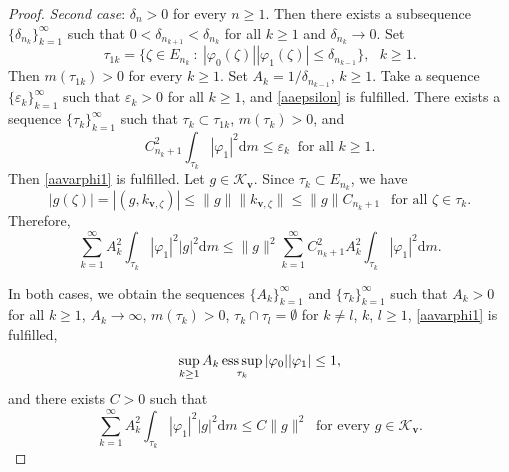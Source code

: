 \documentclass[10pt,a4paper]{amsart}
\begin{document}
\begin{proof}
\emph{Second case}: $\delta_n>0$ for every $n\geq 1$.   Then there exists a subsequence $\{\delta_{n_k}\}_{k=1}^\infty$ such that 
 $0<\delta_{n_{k+1}}<\delta_{n_k}$ for all $k\geq 1$ and $\delta_{n_k}\to 0$. 
Set $$\tau_{1k}=\{\zeta\in E_{n_k}\ : \ |\varphi_0(\zeta)||\varphi_1(\zeta)|\leq\delta_{n_{k-1}}\}, \ \ \ k\geq 1.$$
Then $m(\tau_{1k})>0$ for every $k\geq 1$. Set $A_k=1/\delta_{n_{k-1}}$, $k\geq 1$. 
 Take a sequence $\{\varepsilon_k\}_{k=1}^\infty$ such that 
$\varepsilon_k>0$ for all $k\geq 1$, and \eqref{aaepsilon} is fulfilled. 
There  exists a sequence $\{\tau_k\}_{k=1}^\infty$ such that $\tau_k\subset\tau_{1k}$, $m(\tau_k)>0$, 
and $$C_{n_k+1}^2\int_{\tau_k}|\varphi_1|^2{\mathrm d}m\leq\varepsilon_k \ \text{ for all }k\geq 1.$$
Then \eqref{aavarphi1}  is fulfilled. 
Let $g\in\mathcal K_{\mathbf v}$. Since $\tau_k\subset E_{n_k}$, we have
$$ |g(\zeta)|=|(g,k_{\mathbf v,\zeta})|\leq\|g\|\|k_{\mathbf v,\zeta}\|\leq\|g\|C_{n_k+1}
\ \ \text{ for all }\zeta\in\tau_k.$$
Therefore, 
$$  \sum_{k=1}^\infty A_k^2\int_{\tau_k}|\varphi_1|^2|g|^2{\mathrm d}m
\leq \|g\|^2\sum_{k=1}^\infty C_{n_k+1}^2 A_k^2\int_{\tau_k}|\varphi_1|^2{\mathrm d}m.$$

In both cases, we obtain the sequences  $\{A_k\}_{k=1}^\infty$ and $\{\tau_k\}_{k=1}^\infty$ such that $A_k>0$ for all $k\geq 1$, 
$A_k\to\infty$, $m(\tau_k)>0$, $\tau_k\cap\tau_l=\emptyset$ for $k\neq l$, $k$, $l\geq 1$, \eqref{aavarphi1}  is fulfilled,
\begin{equation}\label{aakdeltak} \sup_{k\geq 1}A_k\mathop{\text{\rm ess\,sup}}_{\tau_k}|\varphi_0||\varphi_1|\leq 1, 
\end{equation}
and there exists $C>0$ such that 
\begin{equation}\label{aavarphi1g} \sum_{k=1}^\infty A_k^2\int_{\tau_k}|\varphi_1|^2|g|^2{\mathrm d}m\leq C\|g\|^2
\ \text{ for every }  g\in\mathcal K_{\mathbf v}.
\end{equation}


\end{proof}
\end{document}
